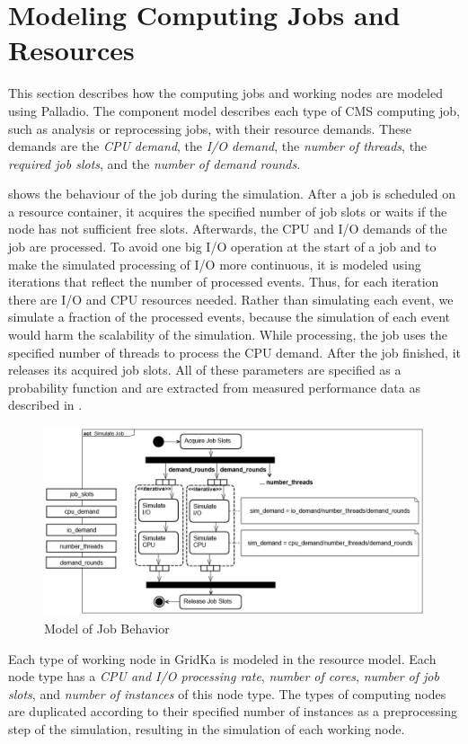 \documentclass{webofc}
\begin{document}
\section{Modeling Computing Jobs and Resources}
\label{sec:model}
This section describes how the computing jobs and working nodes are modeled using Palladio.
The component model describes each type of CMS computing job, such as analysis or reprocessing jobs, with their resource demands. These demands are the \textit{CPU demand}, the\textit{ I/O demand}, the \textit{number of threads}, the \textit{required job slots}, and the \textit{number of demand rounds}.





 shows the behaviour of the job during the simulation. After a job is scheduled on a resource container, it acquires the specified number of job slots or waits if the node has not sufficient free slots. Afterwards, the CPU and I/O demands of the job are processed. To avoid one big I/O operation at the start of a job and to make the simulated processing of I/O more continuous, it is modeled using iterations that reflect the number of processed events. Thus, for each iteration there are I/O and CPU resources needed. Rather than simulating each event, we simulate a fraction of the processed events, because the simulation of each event would harm the scalability of the simulation. 
While processing, the job uses the specified number of threads to process the CPU demand. After the job finished, it releases its acquired job slots. All of these parameters are specified as a probability function and are extracted from measured performance data as described in .


\begin{figure}
	\centering
	\includegraphics[width=0.82\linewidth]{images/seff}
	\caption[]{Model of Job Behavior}
	\label{seff}
\end{figure}

Each type of working node in GridKa is modeled in the resource model. Each node type has a \textit{CPU and I/O processing rate}, \textit{number of cores}, \textit{number of job slots}, and \textit{number of instances} of this node type. The types of computing nodes are duplicated according to their specified number of instances as a preprocessing step of the simulation, resulting in the simulation of each working node.
\end{document}
